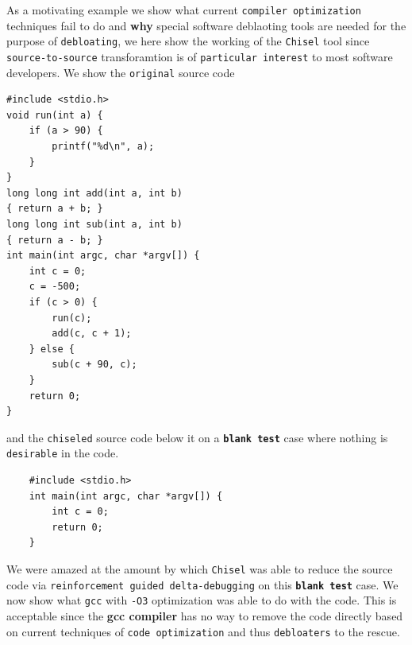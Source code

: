 \documentclass{relatorio}
\begin{document}
As a motivating example we show what current \texttt{compiler optimization} techniques fail to do and \textbf{why} special software deblaoting tools are needed for the purpose of \texttt{debloating}, we here show the working of the \texttt{Chisel} tool since \texttt{source-to-source} transforamtion is of \texttt{particular interest} to most software developers. We show the \texttt{original} source code

\begin{lstlisting}
#include <stdio.h>
void run(int a) {
	if (a > 90) {
		printf("%d\n", a);
	}
}
long long int add(int a, int b) 
{ return a + b; }
long long int sub(int a, int b) 
{ return a - b; }
int main(int argc, char *argv[]) {
	int c = 0;
	c = -500;
	if (c > 0) {
		run(c);
		add(c, c + 1);
	} else {
		sub(c + 90, c);
	}
	return 0;
}
\end{lstlisting} 

and the \texttt{chiseled} source code below it on a \textbf\texttt{blank test} case where nothing is \texttt{desirable} in the code. 

\begin{lstlisting}
	#include <stdio.h>
	int main(int argc, char *argv[]) {
		int c = 0;
		return 0;
	}
\end{lstlisting}

We were amazed at the amount by which \texttt{Chisel} was able to reduce the source code via \texttt{reinforcement guided delta-debugging} on this \textbf\texttt{blank test} case. We now show what \texttt{gcc} with \texttt{-O3} optimization was able to do with the code. This is acceptable since the \textbf{gcc compiler} has no way to remove the code directly based on current techniques of \texttt{code optimization} and thus \texttt{debloaters} to the rescue. 
\end{document}
